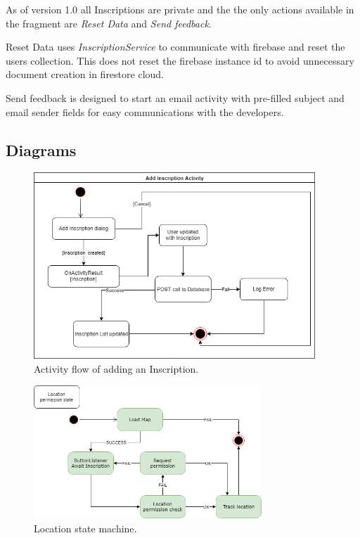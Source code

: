 \documentclass[]{article}
\begin{document}
\begin{flushleft}
As of version 1.0 all Inscriptions are private and the the only actions available in the fragment are \textit{Reset Data} and \textit{Send feedback}.\medskip

Reset Data uses \textit{InscriptionService} to communicate with firebase and reset the users collection. This does not reset the firebase instance id to avoid unnecessary document creation in firestore cloud.\medskip

Send feedback is designed to start an email activity with pre-filled subject and email sender fields for easy communications with the developers.

\newpage
\left\subsection{Diagrams}

\begin{figure}[H]
	\includegraphics[width=\linewidth, height=70mm]{add_ins.png}
	\caption{Activity flow of adding an Inscription.}
	\label{fig:add_activity}
\end{figure}

\begin{figure}[H]
	\includegraphics[width=\linewidth, height=50mm]{perm.png}
	\caption{Location state machine.}
	\label{fig:permission_state}
\end{figure}
\newpage


\end{flushleft}
\end{document}
